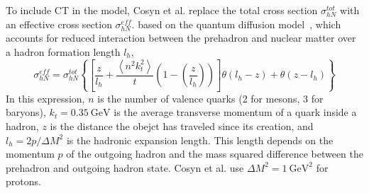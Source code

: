 To include CT in the model, Cosyn et al. replace
the total cross section $\sigma_{hN}^{tot}$
with
an effective cross section $\sigma_{hN}^{eff}$.
based on the quantum diffusion model~\cite{Farrar_1988},
which accounts for reduced interaction between the prehadron and nuclear matter
over a hadron formation length $l_h$,
\begin{equation}
    \sigma_{hN}^{eff} = \sigma_{hN}^{tot}
    \left\{
        \left[\frac{z}{l_h} +
               \frac{\left\langle n^{2} k_{t}^{2}\right\rangle}{t} \left(1-\left(\frac{z}{l_h}\right)\right)
        \right]
        \theta\left(l_h-z\right) +
        \theta\left(z-l_h\right)
    \right\}
\end{equation}
In this expression,
$n$ is the number of valence quarks (2 for mesons, 3 for baryons),
$k_t=\SI{0.35}{\giga\electronvolt}$ is the average transverse momentum of a quark inside a hadron,
$z$ is the distance the obejct has traveled since its creation,
and
$l_h=2p/\Delta M^2$ is the hadronic expansion length.
This length depends on
the momentum $p$ of the outgoing hadron
and
the mass squared difference between the prehadron and outgoing hadron state.
Cosyn et al. use $\Delta M^2 = \SI{1}{\giga\electronvolt\squared}$ for protons.
